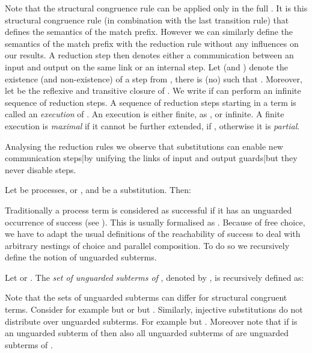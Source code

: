 \documentclass[]{article}
\begin{document}
Note that the structural congruence rule  can be applied only in the full \piCal. It is this structural congruence rule (in combination with the last transition rule) that defines the semantics of the match prefix. However we can similarly define the semantics of the match prefix with the reduction rule  without any influences on our results.
A reduction step  then denotes either a communication between an input and output on the same link or an internal step.
Let  (and ) denote the existence (and non-existence) of a step from , \ie there is (no)  such that . Moreover, let  be the reflexive and transitive closure of . We write  if  can perform an infinite sequence of reduction steps. A sequence of reduction steps starting in a term  is called an \emph{execution} of . An execution is either finite, as , or infinite. A finite execution  is \emph{maximal} if it cannot be further extended, \ie if , otherwise it is \emph{partial}.

Analysing the reduction rules we observe that substitutions can enable new communication steps|by unifying the links of input and output guards|but they never disable steps.

\begin{obs}
	\label{obs:subsSteps}
	Let  be processes, \ie  or , and  be a substitution.
	Then:
	
\end{obs}

Traditionally a process term is considered as successful if it has an unguarded occurrence of success (see \eg \cite{gorla}). This is usually formalised as . Because of free choice, we have to adapt the usual definitions of the reachability of success to deal with arbitrary nestings of choice and parallel composition. To do so we recursively define the notion of unguarded subterms.

\begin{definition}
	\label{def:unguardedSubterms}
	Let  or . The \emph{set of unguarded subterms of} , denoted by , is recursively defined as:
	\vspace*{-0.6em}
	
	\vspace*{-1.1em}
\end{definition}

\noindent
Note that the sets of unguarded subterms can differ for structural congruent terms. Consider for example  but 
or  but .
Similarly, injective substitutions do not distribute over unguarded subterms.
For example  but .
Moreover note that if  is an unguarded subterm of  then also all unguarded subterms of  are unguarded subterms of .
\end{document}
